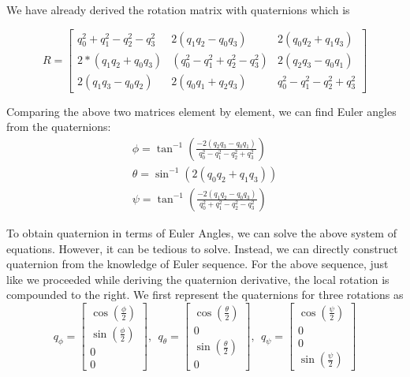 \documentclass{article}
\begin{document}
 We have already derived the rotation matrix with quaternions which is
 
 	\begin{equation}
 	R = \begin{bmatrix}
 	q_0^2+q_1^2-q_2^2-q_3^2 &   2(q_1q_2-q_0q_3)   &      2(q_0q_2+q_1q_3)\\
 	2*(q_1q_2+q_0q_3)&   (q_0^2-q_1^2+q_2^2-q_3^2) &   2(q_2q_3-q_0q_1)\\
 	2(q_1q_3-q_0q_2) &    2(q_0q_1+q_2q_3)        & q_0^2-q_1^2-q_2^2+q_3^2		
 	\end{bmatrix}		
 	\end{equation}
 	
 	Comparing the above two matrices element by element, we can find Euler angles from the quaternions:
 	\begin{eqnarray}
 		\phi = \tan^{-1}\left(\frac{-2(q_2q_3-q_0q_1)}{q_0^2-q_1^2-q_2^2+q_3^2}\right)\\
 		\theta = \sin^{-1}\left(2(q_0q_2+q_1q_3)\right)\\
 		\psi = \tan^{-1}\left(\frac{-2(q_1q_2-q_0q_3)}{q_0^2+q_1^2-q_2^2-q_3^2}\right)
 	\end{eqnarray}
 	
 	To obtain quaternion in terms of Euler Angles, we can solve the above system of equations. However, it can be tedious to solve. Instead, we can directly construct quaternion from the knowledge of Euler sequence. For the above sequence, just like we proceeded while deriving the quaternion derivative, the local rotation is compounded to the right. We first represent the quaternions for three rotations as
 	\begin{equation}
 	   q_{\phi} = \begin{bmatrix}
 	   \cos\left(\frac{\phi}{2}\right)\\
 	   \sin\left(\frac{\phi}{2}\right)\\
 	   0\\
 	   0
 	   \end{bmatrix}, ~~ q_{\theta} = \begin{bmatrix}
 	   \cos\left(\frac{\theta}{2}\right)\\
 	   0\\
 	   \sin\left(\frac{\theta}{2}\right)\\
 	   0
 	   \end{bmatrix}, ~~ q_{\psi} = \begin{bmatrix}
 	   \cos\left(\frac{\psi}{2}\right)\\
 	   0\\
 	   0\\
 	   \sin\left(\frac{\psi}{2}\right)
 	   \end{bmatrix}
 	\end{equation}
 	
\end{document}
